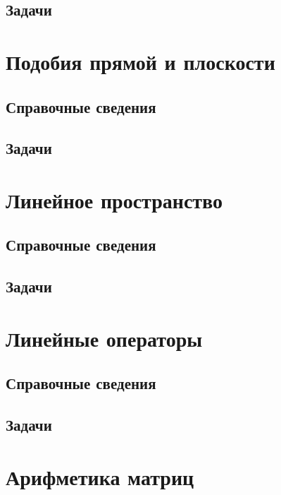 \subsection*{Задачи}




\section{Подобия прямой и плоскости}


\subsection*{Справочные сведения}

\subsection*{Задачи}



\section{Линейное пространство}

\subsection*{Справочные сведения}

\subsection*{Задачи}



\section{Линейные операторы}

\subsection*{Справочные сведения}

\subsection*{Задачи}



\section{Арифметика матриц}

